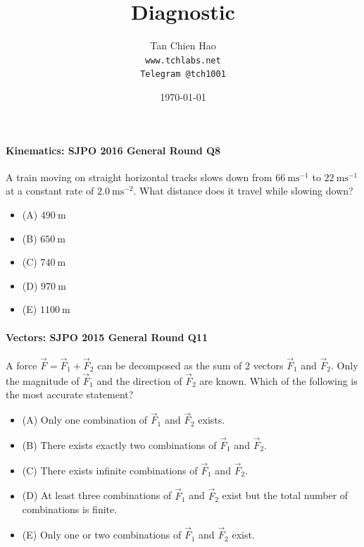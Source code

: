 \documentclass{article}
\title{Diagnostic}
\author{
    Tan Chien Hao\\
    \texttt{www.tchlabs.net}\\
    \texttt{Telegram @tch1001}
}
\date{\today}
\begin{document}
\newif\ifpaper

\paperfalse 

\maketitle

\paragraph{Kinematics: SJPO 2016 General Round Q8}
A train moving on straight horizontal tracks slows down from $66 \mathrm{~ms}^{-1}$ to $22 \mathrm{~ms}^{-1}$ at a constant rate of $2.0 \mathrm{~ms}^{-2}$. What distance does it travel while slowing down?
\begin{itemize}
\item[](A) $490 \mathrm{~m}$
\item[](B) $650 \mathrm{~m}$
\item[](C) $740 \mathrm{~m}$
\item[](D) $970 \mathrm{~m}$ 
\item[](E) $1100 \mathrm{~m}$ \end{itemize}

\paragraph{Vectors: SJPO 2015 General Round Q11}
A force $\vec{F} = \vec{F}_1 + \vec{F}_2$ can be decomposed as the sum of 2 vectors $\vec{F}_1$ and $\vec{F}_2$. Only the magnitude of $\vec{F}_1$ and the direction of $\vec{F}_2$ are known. Which of the following is the most accurate statement?
\begin{itemize}
\item[](A) Only one combination of $\vec{F}_1$ and $\vec{F}_2$ exists.
\item[](B) There exists exactly two combinations of $\vec{F}_1$ and $\vec{F}_2$.
\item[](C) There exists infinite combinations of $\vec{F}_1$ and $\vec{F}_2$.
\item[](D) At least three combinations of $\vec{F}_1$ and $\vec{F}_2$ exist but the total number of combinations is finite.
\item[](E) Only one or two combinations of $\vec{F}_1$ and $\vec{F}_2$ exist.
\end{itemize}
\end{document}
